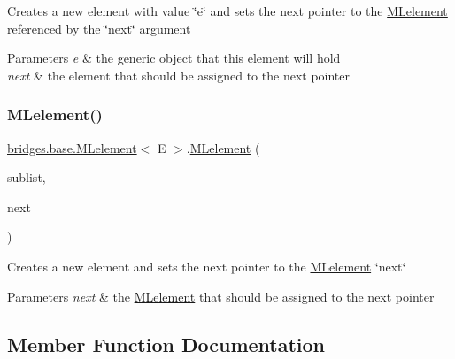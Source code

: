 Creates a new element with value \char`\"{}e\char`\"{} and sets the next pointer to the \mbox{\hyperlink{classbridges_1_1base_1_1_m_lelement}{M\+Lelement}} referenced by the \char`\"{}next\char`\"{} argument


\begin{DoxyParams}{Parameters}
{\em e} & the generic object that this element will hold \\
\hline
{\em next} & the element that should be assigned to the next pointer \\
\hline
\end{DoxyParams}
\mbox{\label{classbridges_1_1base_1_1_m_lelement_aa660281523a7de140a0b17737096a332}} 
\subsubsection{\texorpdfstring{MLelement()}{MLelement()}\hspace{0.1cm}{\footnotesize\ttfamily [4/4]}}
{\footnotesize\ttfamily \mbox{\hyperlink{classbridges_1_1base_1_1_m_lelement}{bridges.\+base.\+M\+Lelement}}$<$ E $>$.\mbox{\hyperlink{classbridges_1_1base_1_1_m_lelement}{M\+Lelement}} (\begin{DoxyParamCaption}\item[{\mbox{\hyperlink{classbridges_1_1base_1_1_m_lelement}{M\+Lelement}}$<$ E $>$}]{sublist,  }\item[{\mbox{\hyperlink{classbridges_1_1base_1_1_m_lelement}{M\+Lelement}}$<$ E $>$}]{next }\end{DoxyParamCaption})}

Creates a new element and sets the next pointer to the \mbox{\hyperlink{classbridges_1_1base_1_1_m_lelement}{M\+Lelement}} \char`\"{}next\char`\"{} 
\begin{DoxyParams}{Parameters}
{\em next} & the \mbox{\hyperlink{classbridges_1_1base_1_1_m_lelement}{M\+Lelement}} that should be assigned to the next pointer \\
\hline
\end{DoxyParams}


\subsection{Member Function Documentation}
\mbox{\label{classbridges_1_1base_1_1_m_lelement_aa2e26697e2c70a36b8345a324d00679a}} 
